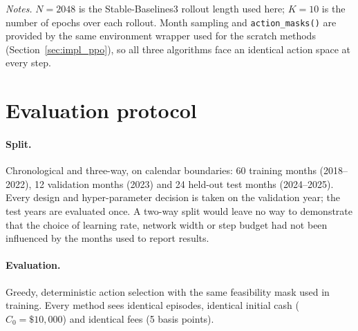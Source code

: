 \noindent\textit{Notes.} $N{=}2048$ is the Stable-Baselines3 rollout length used here;
$K{=}10$ is the number of epochs over each rollout. Month sampling and
\texttt{action\_masks()} are provided by the same environment wrapper used for
the scratch methods (Section~\ref{sec:impl_ppo}), so all three algorithms face
an identical action space at every step.

\section{Evaluation protocol}
\label{sec:protocol}

\paragraph{Split.} Chronological and three-way, on calendar boundaries:
60 training months (2018--2022), 12 validation months (2023) and 24
held-out test months (2024--2025). Every design and hyper-parameter
decision is taken on the validation year; the test years are evaluated
once. A two-way split would leave no way to demonstrate that the choice of
learning rate, network width or step budget had not been influenced by the
months used to report results.

\paragraph{Evaluation.} Greedy, deterministic action selection with the
same feasibility mask used in training. Every method sees identical
episodes, identical initial cash ($C_0 = \$10{,}000$) and identical fees
(5 basis points).


